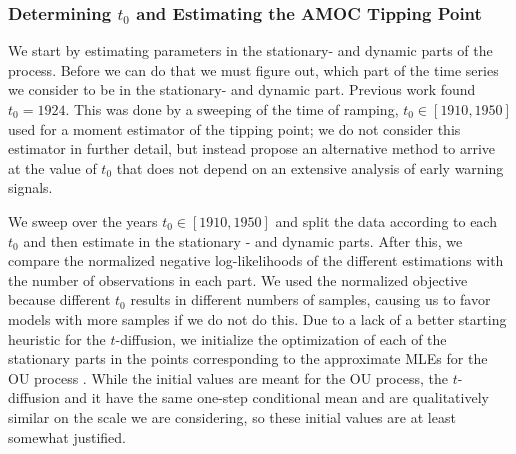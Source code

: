 \subsubsection{Determining \texorpdfstring{$t_0$}{t0} and Estimating the AMOC Tipping Point}
We start by estimating parameters in the stationary- and dynamic parts of the process. Before we can do that we must figure out, which part of the time series we consider to be in the stationary- and dynamic part. Previous work found $t_0 = 1924$. This was done by a sweeping of the time of ramping, $t_0 \in [1910, 1950]$ used for a moment estimator of the tipping point; we do not consider this estimator in further detail, but instead propose an alternative method to arrive at the value of $t_0$ that does not depend on an extensive analysis of early warning signals. 

We sweep over the years $t_0 \in [1910, 1950]$ and split the data according to each $t_0$ and then estimate in the stationary - and dynamic parts. After this, we compare the normalized negative log-likelihoods of the different estimations with the number of observations in each part. We used the normalized objective because different $t_0$ results in different numbers of samples, causing us to favor models with more samples if we do not do this. Due to a lack of a better starting heuristic for the $t$-diffusion, we initialize the optimization of each of the stationary parts in the points corresponding to the approximate MLEs for the OU process \cite[equation (S4-S6)]{DitlevsenSupplementary}. While the initial values are meant for the OU process, the $t$-diffusion and it have the same one-step conditional mean and are qualitatively similar on the scale we are considering, so these initial values are at least somewhat justified.

